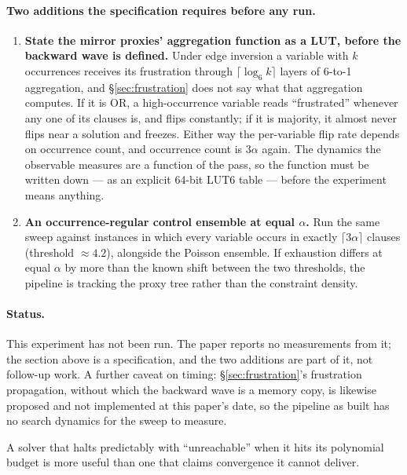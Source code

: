\documentclass[11pt]{article}
\begin{document}
\paragraph{Two additions the specification requires before any run.}
\begin{enumerate}[label=\textbf{(\roman*)},leftmargin=2.4em]
  \item \textbf{State the mirror proxies' aggregation function as a
        LUT, before the backward wave is defined.} Under edge
        inversion a variable with $k$ occurrences receives its
        frustration through $\lceil\log_6 k\rceil$ layers of 6-to-1
        aggregation, and \S\ref{sec:frustration} does not say what
        that aggregation computes. If it is OR, a high-occurrence
        variable reads ``frustrated'' whenever any one of its clauses
        is, and flips constantly; if it is majority, it almost never
        flips near a solution and freezes. Either way the per-variable
        flip rate depends on occurrence count, and occurrence count is
        $3\alpha$ again. The dynamics the observable measures are a
        function of the pass, so the function must be written down ---
        as an explicit 64-bit LUT6 table --- before the experiment
        means anything.
  \item \textbf{An occurrence-regular control ensemble at equal
        $\alpha$.} Run the same sweep against instances in which every
        variable occurs in exactly $\lceil 3\alpha \rceil$ clauses
        (threshold $\approx 4.2$), alongside the Poisson ensemble. If
        exhaustion differs at equal $\alpha$ by more than the known
        shift between the two thresholds, the pipeline is tracking the
        proxy tree rather than the constraint density.
\end{enumerate}

\paragraph{Status.} This experiment has not been run. The paper
reports no measurements from it; the section above is a
specification, and the two additions are part of it, not follow-up
work. A further caveat on timing: \S\ref{sec:frustration}'s
frustration propagation, without which the backward wave is a memory
copy, is likewise proposed and not implemented at this paper's date,
so the pipeline as built has no search dynamics for the sweep to
measure.

A solver that halts predictably with ``unreachable'' when it hits its
polynomial budget is more useful than one that claims convergence it
cannot deliver.
\end{document}
